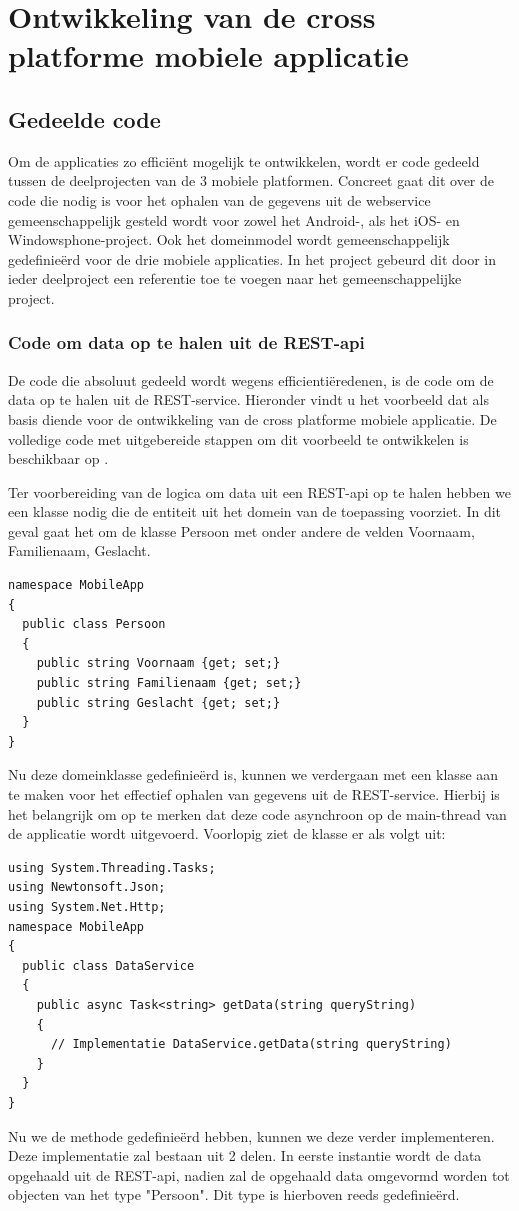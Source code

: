 \section{Ontwikkeling van de cross platforme mobiele applicatie}
\subsection{Gedeelde code}
Om de applicaties zo efficiënt mogelijk te ontwikkelen, wordt er code gedeeld tussen de deelprojecten van de 3 mobiele
platformen. Concreet gaat dit over de code die nodig is voor het ophalen van de gegevens uit de webservice gemeenschappelijk
gesteld wordt voor zowel het Android-, als het iOS- en Windowsphone-project. Ook het domeinmodel wordt gemeenschappelijk
gedefinieërd voor de drie mobiele applicaties. In het project gebeurd dit door in ieder deelproject een referentie toe te voegen
naar het gemeenschappelijke project.

\subsubsection{Code om data op te halen uit de REST-api}
De code die absoluut gedeeld wordt wegens efficientiëredenen, is de code om de data op te halen uit de REST-service.
Hieronder vindt u het voorbeeld dat als basis diende voor de ontwikkeling van de cross platforme mobiele applicatie.
De volledige code met uitgebereide stappen om dit voorbeeld te ontwikkelen is beschikbaar op \citet{buildappwithnativeuiusingxamarininvisualstudio2017}.

Ter voorbereiding van de logica om data uit een REST-api op te halen hebben we een klasse nodig die de entiteit uit het
domein van de toepassing voorziet. In dit geval gaat het om de klasse Persoon met onder andere de velden Voornaam, Familienaam, Geslacht.
\newpage
\begin{lstlisting}
namespace MobileApp
{
  public class Persoon
  {
    public string Voornaam {get; set;}
    public string Familienaam {get; set;}
    public string Geslacht {get; set;}
  }
}
\end{lstlisting}
Nu deze domeinklasse gedefinieërd is, kunnen we verdergaan met een klasse aan te maken voor het effectief ophalen van
gegevens uit de REST-service. Hierbij is het belangrijk om op te merken dat deze code asynchroon op de main-thread van de
applicatie wordt uitgevoerd. Voorlopig ziet de klasse er als volgt uit:
\begin{lstlisting}
using System.Threading.Tasks;
using Newtonsoft.Json;
using System.Net.Http;
namespace MobileApp
{
  public class DataService
  {
    public async Task<string> getData(string queryString)
    {
      // Implementatie DataService.getData(string queryString)
    }
  }
}
\end{lstlisting}
Nu we de methode gedefinieërd hebben, kunnen we deze verder implementeren.
Deze implementatie zal bestaan uit 2 delen. In eerste instantie wordt de data opgehaald uit de REST-api, nadien zal de opgehaald data
omgevormd worden tot objecten van het type "Persoon". Dit type is hierboven reeds gedefinieërd.

